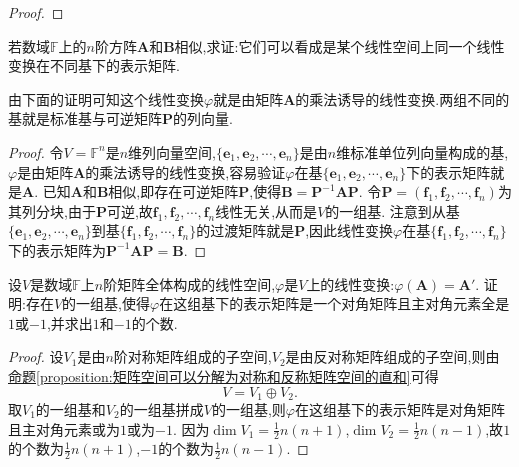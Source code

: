 \documentclass[../../main.tex]{subfiles}
\begin{document}
\begin{proof}
\end{proof}

\begin{proposition}\label{proposition:相似矩阵可看作一个线性变换在不同基下的表示矩阵}
若数域\(\mathbb{F}\)上的\(n\)阶方阵\(\boldsymbol{A}\)和\(\boldsymbol{B}\)相似,求证:它们可以看成是某个线性空间上同一个线性变换在不同基下的表示矩阵.
\end{proposition}
\begin{note}
由下面的证明可知这个线性变换\(\varphi\)就是由矩阵\(\boldsymbol{A}\)的乘法诱导的线性变换.两组不同的基就是标准基与可逆矩阵\(\boldsymbol{P}\)的列向量.
\end{note}
\begin{proof}
令\(V = \mathbb{F}^n\)是\(n\)维列向量空间,\(\{\boldsymbol{e}_1,\boldsymbol{e}_2,\cdots,\boldsymbol{e}_n\}\)是由\(n\)维标准单位列向量构成的基,\(\varphi\)是由矩阵\(\boldsymbol{A}\)的乘法诱导的线性变换,容易验证\(\varphi\)在基\(\{\boldsymbol{e}_1,\boldsymbol{e}_2,\cdots,\boldsymbol{e}_n\}\)下的表示矩阵就是\(\boldsymbol{A}\). 已知\(\boldsymbol{A}\)和\(\boldsymbol{B}\)相似,即存在可逆矩阵\(\boldsymbol{P}\),使得\(\boldsymbol{B}=\boldsymbol{P}^{-1}\boldsymbol{A}\boldsymbol{P}\).
令\(\boldsymbol{P}=(\boldsymbol{f}_1,\boldsymbol{f}_2,\cdots,\boldsymbol{f}_n)\)为其列分块,由于\(\boldsymbol{P}\)可逆,故\(\boldsymbol{f}_1,\boldsymbol{f}_2,\cdots,\boldsymbol{f}_n\)线性无关,从而是\(V\)的一组基. 注意到从基\(\{\boldsymbol{e}_1,\boldsymbol{e}_2,\cdots,\boldsymbol{e}_n\}\)到基\(\{\boldsymbol{f}_1,\boldsymbol{f}_2,\cdots,\boldsymbol{f}_n\}\)的过渡矩阵就是\(\boldsymbol{P}\),因此线性变换\(\varphi\)在基\(\{\boldsymbol{f}_1,\boldsymbol{f}_2,\cdots,\boldsymbol{f}_n\}\)下的表示矩阵为\(\boldsymbol{P}^{-1}\boldsymbol{A}\boldsymbol{P}=\boldsymbol{B}\). 

\end{proof}

\begin{example}
设\(V\)是数域\(\mathbb{F}\)上\(n\)阶矩阵全体构成的线性空间,\(\varphi\)是\(V\)上的线性变换:\(\varphi(\boldsymbol{A})=\boldsymbol{A}'\). 证明:存在\(V\)的一组基,使得\(\varphi\)在这组基下的表示矩阵是一个对角矩阵且主对角元素全是\(1\)或\(-1\),并求出\(1\)和\(-1\)的个数.
\end{example}
\begin{proof}
设\(V_1\)是由\(n\)阶对称矩阵组成的子空间,\(V_2\)是由反对称矩阵组成的子空间,则由\hyperref[proposition:矩阵空间可以分解为对称和反称矩阵空间的直和]{命题\ref{proposition:矩阵空间可以分解为对称和反称矩阵空间的直和}}可得
\[
V = V_1\oplus V_2.
\]
取\(V_1\)的一组基和\(V_2\)的一组基拼成\(V\)的一组基,则\(\varphi\)在这组基下的表示矩阵是对角矩阵且主对角元素或为\(1\)或为\(-1\). 因为\(\dim V_1=\frac{1}{2}n(n + 1)\),\(\dim V_2=\frac{1}{2}n(n - 1)\),故\(1\)的个数为\(\frac{1}{2}n(n + 1)\),\(-1\)的个数为\(\frac{1}{2}n(n - 1)\).

\end{proof}
\end{document}
